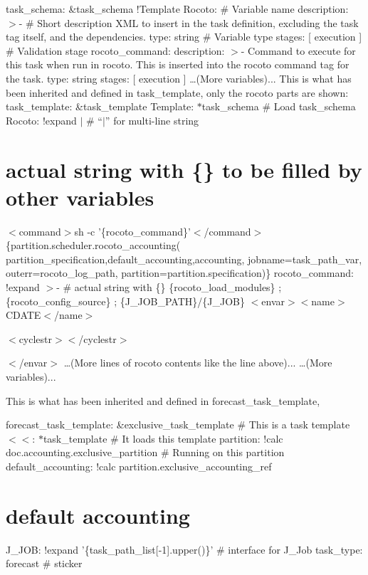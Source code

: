 task\-\_\-schema\-: \&task\-\_\-schema !\-Template Rocoto\-: \# Variable name description\-: $>$-\/ \# Short description X\-M\-L to insert in the task definition, excluding the task tag itself, and the dependencies. type\-: string \# Variable type stages\-: \mbox{[} execution \mbox{]} \# Validation stage rocoto\-\_\-command\-: description\-: $>$-\/ Command to execute for this task when run in rocoto. This is inserted into the rocoto command tag for the task. type\-: string stages\-: \mbox{[} execution \mbox{]} …(\-More variables)... This is what has been inherited and defined in task\-\_\-template, only the rocoto parts are shown\-: task\-\_\-template\-: \&task\-\_\-template Template\-: $\ast$task\-\_\-schema \# Load task\-\_\-schema Rocoto\-: !expand $|$ \# “$|$” for multi-\/line string \section*{actual string with \{\} to be filled by other variables}

$<$command$>$sh -\/c '\{rocoto\-\_\-command\}'$<$/command$>$ \{partition.\-scheduler.\-rocoto\-\_\-accounting( partition\-\_\-specification,default\-\_\-accounting,accounting, jobname=task\-\_\-path\-\_\-var, outerr=rocoto\-\_\-log\-\_\-path, partition=partition.\-specification)\} rocoto\-\_\-command\-: !expand $>$-\/ \# actual string with \{\} \{rocoto\-\_\-load\-\_\-modules\} ; \{rocoto\-\_\-config\-\_\-source\} ; \{J\-\_\-\-J\-O\-B\-\_\-\-P\-A\-T\-H\}/\{J\-\_\-\-J\-O\-B\} $<$envar$>$$<$name$>$C\-D\-A\-T\-E$<$/name$>$

$<$cyclestr$>$$<$/cyclestr$>$

$<$/envar$>$ …(\-More lines of rocoto contents like the line above)... …(\-More variables)...

This is what has been inherited and defined in forecast\-\_\-task\-\_\-template,

forecast\-\_\-task\-\_\-template\-: \&exclusive\-\_\-task\-\_\-template \# This is a task template $<$$<$\-: $\ast$task\-\_\-template \# It loads this template partition\-: !calc doc.\-accounting.\-exclusive\-\_\-partition \# Running on this partition default\-\_\-accounting\-: !calc partition.\-exclusive\-\_\-accounting\-\_\-ref \section*{default accounting}

J\-\_\-\-J\-O\-B\-: !expand '\{task\-\_\-path\-\_\-list\mbox{[}-\/1\mbox{]}.upper()\}' \# interface for J\-\_\-\-Job task\-\_\-type\-: forecast \# sticker


